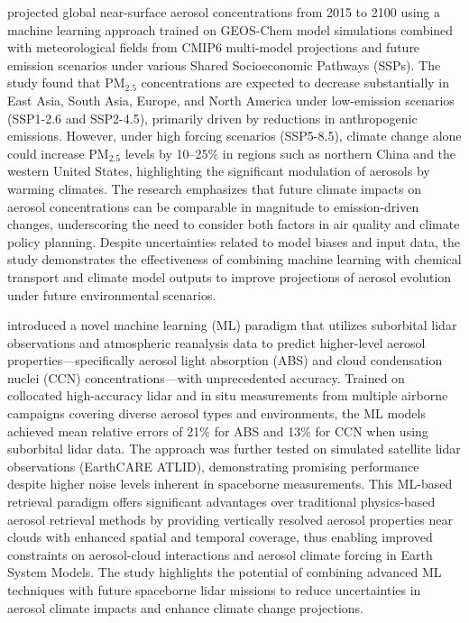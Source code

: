 \documentclass[11pt]{article}
\begin{document}
\citet{li2022projected} projected global near-surface aerosol concentrations from 2015 to 2100 using a machine learning approach trained on GEOS-Chem model simulations combined with meteorological fields from CMIP6 multi-model projections and future emission scenarios under various Shared Socioeconomic Pathways (SSPs). The study found that PM$_{2.5}$ concentrations are expected to decrease substantially in East Asia, South Asia, Europe, and North America under low-emission scenarios (SSP1-2.6 and SSP2-4.5), primarily driven by reductions in anthropogenic emissions. However, under high forcing scenarios (SSP5-8.5), climate change alone could increase PM$_{2.5}$ levels by 10–25\% in regions such as northern China and the western United States, highlighting the significant modulation of aerosols by warming climates. The research emphasizes that future climate impacts on aerosol concentrations can be comparable in magnitude to emission-driven changes, underscoring the need to consider both factors in air quality and climate policy planning. Despite uncertainties related to model biases and input data, the study demonstrates the effectiveness of combining machine learning with chemical transport and climate model outputs to improve projections of aerosol evolution under future environmental scenarios.

\citet{redemann2024machine} introduced a novel machine learning (ML) paradigm that utilizes suborbital lidar observations and atmospheric reanalysis data to predict higher-level aerosol properties—specifically aerosol light absorption (ABS) and cloud condensation nuclei (CCN) concentrations—with unprecedented accuracy. Trained on collocated high-accuracy lidar and in situ measurements from multiple airborne campaigns covering diverse aerosol types and environments, the ML models achieved mean relative errors of 21\% for ABS and 13\% for CCN when using suborbital lidar data. The approach was further tested on simulated satellite lidar observations (EarthCARE ATLID), demonstrating promising performance despite higher noise levels inherent in spaceborne measurements. This ML-based retrieval paradigm offers significant advantages over traditional physics-based aerosol retrieval methods by providing vertically resolved aerosol properties near clouds with enhanced spatial and temporal coverage, thus enabling improved constraints on aerosol-cloud interactions and aerosol climate forcing in Earth System Models. The study highlights the potential of combining advanced ML techniques with future spaceborne lidar missions to reduce uncertainties in aerosol climate impacts and enhance climate change projections.
\end{document}
